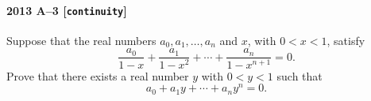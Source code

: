 \paragraph{2013 A--3 \textnormal{[\texttt{continuity}]}}
Suppose that the real numbers $a_0, a_1, \dots, a_n$ and
$x$, with $0 < x < 1$, satisfy
\[
\frac{a_0}{1-x} + \frac{a_1}{1-x^2} + \cdots + \frac{a_n}{1 - x^{n+1}} = 0.
\]
Prove that there exists a real number $y$ with $0 < y < 1$ such that
\[
a_0 + a_1 y + \cdots + a_n y^n = 0.
\]
